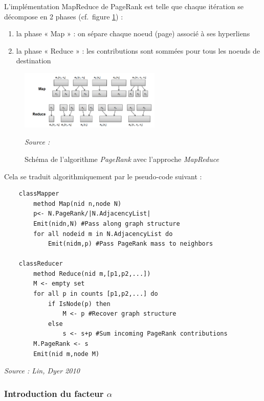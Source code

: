 \documentclass[10pt,a4paper]{article}
\providecommand{\tightlist}{%
  \setlength{\parskip}{0pt}
  }
\theoremstyle{break}
\begin{document}
L'implémentation MapReduce de PageRank est telle que chaque itération se décompose en 2 phases (cf.~figure \ref{fig:fig2}) :

\begin{enumerate}
\def\labelenumi{\arabic{enumi}.}
\tightlist
\item
  la phase « Map » : on sépare chaque noeud (page) associé à ses hyperliens
\item
  la phase « Reduce » : les contributions sont sommées pour tous les noeuds de destination
\end{enumerate}

\begin{figure}[htp]
\begin{center}
\includegraphics[width=0.6\textwidth]{img/img2.png}
\captionsetup{margin=0cm,format=hang,justification=justified}
\caption{Schéma de l'algorithme \emph{PageRank} avec l'approche \emph{MapReduce}}\label{fig:fig2}
\emph{Source : \cite{Lin}}
\end{center}
\end{figure}

Cela se traduit algorithmiquement par le pseudo-code suivant :

\begin{verbatim}
    classMapper
        method Map(nid n,node N)
        p<- N.PageRank/|N.AdjacencyList|
        Emit(nidn,N) #Pass along graph structure
        for all nodeid m in N.AdjacencyList do
            Emit(nidm,p) #Pass PageRank mass to neighbors

    classReducer
        method Reduce(nid m,[p1,p2,...])
        M <- empty set
        for all p in counts [p1,p2,...] do
            if IsNode(p) then
                M <- p #Recover graph structure
            else
                s <- s+p #Sum incoming PageRank contributions
        M.PageRank <- s
        Emit(nid m,node M)
\end{verbatim}

\emph{Source : Lin, Dyer 2010}

\hypertarget{introduction-du-facteur-alpha}{%
\subsubsection{\texorpdfstring{Introduction du facteur \(\alpha\)}{Introduction du facteur \textbackslash{}alpha}}\label{introduction-du-facteur-alpha}}
\end{document}
